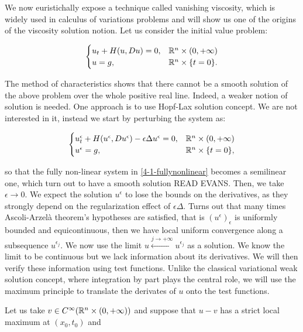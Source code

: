 We now euristichally expose a technique called vanishing viscosity, which is widely used in 
calculus of variations problems and will show us one of the origins of the viscosity 
solution notion. Let us consider the initial value problem:

\begin{equation}\label{4-1-fullynonlinear}
    \begin{cases}
        u_t + H(u,Du) = 0,& \mathbb{R}^n\times(0,+\infty) \\
        u = g,& \mathbb{R}^n\times\{t=0\}.
    \end{cases}
\end{equation}

The method of characteristics shows that there cannot be a smooth solution of the above problem over the whole positive 
real line. Indeed, a weaker notion of solution is needed. One approach is to use Hopf-Lax solution concept. We are not 
interested in it, instead we start by perturbing the system as:

\begin{equation}
    \begin{cases}
        u^{\epsilon}_t + H(u^{\epsilon},Du^{\epsilon}) -\epsilon\Delta u^{\epsilon}= 0,& \mathbb{R}^n\times(0,+\infty) \\
        u^{\epsilon} = g,& \mathbb{R}^n\times\{t=0\},
    \end{cases}
\end{equation}

so that the fully non-linear system in \ref{4-1-fullynonlinear} becomes a semilinear one, which turn out to have a smooth solution {\color{red}{}READ EVANS}. 
Then, we take $\epsilon\to0$. We expect the solution $u^{\epsilon}$ to lose the bounds on the derivatives, as they strongly depend on the 
regularization effect of $\epsilon\Delta$. Turns out that many times Ascoli-Arzelà theorem's hypotheses are satisfied, that is $(u^{\epsilon})_{\epsilon}$ 
is uniformly bounded and equicontinuous, then we have local uniform convergence along a subsequence $u^{\epsilon_j}$. We now use the limit
$u\xleftarrow{j\to+\infty}u^{\epsilon_j}$ as a solution. 
We know the limit to be continuous but we lack information about its derivatives. We will then verify these information using test functions. 
Unlike the classical variational weak solution concept, where integration by part plays the central role, we will use the maximum principle 
to translate the derivates of $u$ onto the test functions. 

Let us take $v\in C^{\infty}(\mathbb{R}^n\times(0,+\infty))$ and suppose that $u-v$ has a strict local maximum at $(x_0,t_0)$ and 

